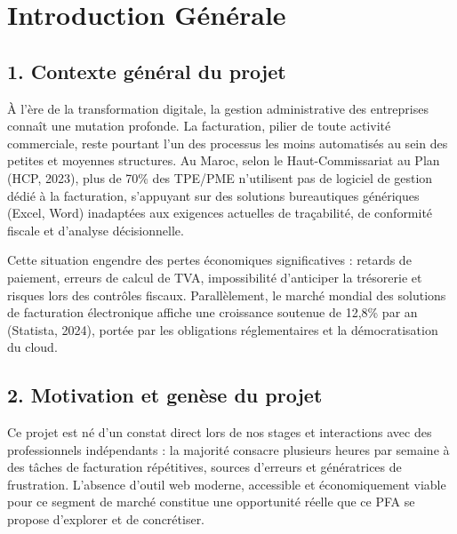 \documentclass[12pt,a4paper]{report}
\begin{document}
\clearpage
{}

\chapter*{Introduction Générale}

\section*{1. Contexte général du projet}

À l'ère de la transformation digitale, la gestion administrative des entreprises connaît une mutation profonde. La facturation, pilier de toute activité commerciale, reste pourtant l'un des processus les moins automatisés au sein des petites et moyennes structures. Au Maroc, selon le Haut-Commissariat au Plan (HCP, 2023), plus de 70\% des TPE/PME n'utilisent pas de logiciel de gestion dédié à la facturation, s'appuyant sur des solutions bureautiques génériques (Excel, Word) inadaptées aux exigences actuelles de traçabilité, de conformité fiscale et d'analyse décisionnelle.

Cette situation engendre des pertes économiques significatives : retards de paiement, erreurs de calcul de TVA, impossibilité d'anticiper la trésorerie et risques lors des contrôles fiscaux. Parallèlement, le marché mondial des solutions de facturation électronique affiche une croissance soutenue de 12,8\% par an (Statista, 2024), portée par les obligations réglementaires et la démocratisation du cloud.

\section*{2. Motivation et genèse du projet}

Ce projet est né d'un constat direct lors de nos stages et interactions avec des professionnels indépendants : la majorité consacre plusieurs heures par semaine à des tâches de facturation répétitives, sources d'erreurs et génératrices de frustration. L'absence d'outil web moderne, accessible et économiquement viable pour ce segment de marché constitue une opportunité réelle que ce PFA se propose d'explorer et de concrétiser.
\end{document}
